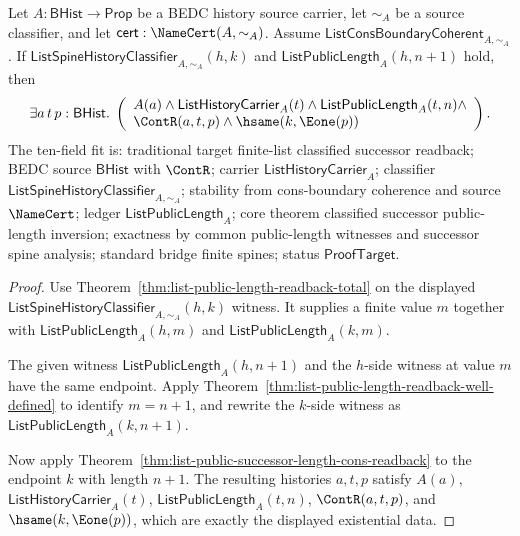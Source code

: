\begin{theorem}
\label{thm:list-classified-successor-length-cons-readback}
Let $A:\mathsf{BHist}\to\mathsf{Prop}$ be a BEDC history source carrier, let
$\sim_A$ be a source classifier, and let
$\mathsf{cert}:\NameCert(A,\sim_A)$. Assume
$\mathsf{ListConsBoundaryCoherent}_{A,\sim_A}$. If
$\mathsf{ListSpineHistoryClassifier}_{A,\sim_A}(h,k)$ and
$\mathsf{ListPublicLength}_A(h,n+1)$ hold, then
$$
\exists a\,t\,p:\mathsf{BHist}.\;
\left(
\begin{array}{l}
A(a)\land \mathsf{ListHistoryCarrier}_A(t)\land
\mathsf{ListPublicLength}_A(t,n)\land\\
\ContR(a,t,p)\land \hsame(k,\Eone(p))
\end{array}
\right).
$$
The ten-field fit is: traditional target finite-list classified successor
readback; BEDC source $\mathsf{BHist}$ with $\ContR$; carrier
$\mathsf{ListHistoryCarrier}_A$; classifier
$\mathsf{ListSpineHistoryClassifier}_{A,\sim_A}$; stability from
cons-boundary coherence and source $\NameCert$; ledger
$\mathsf{ListPublicLength}_A$; core theorem classified successor public-length
inversion; exactness by common public-length witnesses and successor spine
analysis; standard bridge finite spines; status $\mathsf{ProofTarget}$.
\end{theorem}
\begin{proof}
Use Theorem~\ref{thm:list-public-length-readback-total} on the displayed
$\mathsf{ListSpineHistoryClassifier}_{A,\sim_A}(h,k)$ witness. It supplies a
finite value $m$ together with
$\mathsf{ListPublicLength}_A(h,m)$ and
$\mathsf{ListPublicLength}_A(k,m)$.

The given witness $\mathsf{ListPublicLength}_A(h,n+1)$ and the $h$-side witness
at value $m$ have the same endpoint. Apply
Theorem~\ref{thm:list-public-length-readback-well-defined} to identify
$m=n+1$, and rewrite the $k$-side witness as
$\mathsf{ListPublicLength}_A(k,n+1)$.

Now apply Theorem~\ref{thm:list-public-successor-length-cons-readback} to the
endpoint $k$ with length $n+1$. The resulting histories $a,t,p$ satisfy
$A(a)$, $\mathsf{ListHistoryCarrier}_A(t)$,
$\mathsf{ListPublicLength}_A(t,n)$, $\ContR(a,t,p)$, and
$\hsame(k,\Eone(p))$, which are exactly the displayed existential data.
\end{proof}

